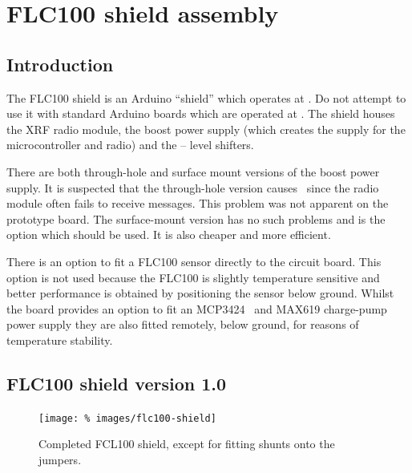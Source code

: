 \chapter{FLC100 shield assembly}

\section{Introduction}
The FLC100 shield is an Arduino ``shield'' which operates at
. Do not attempt to use it with standard Arduino boards
which are operated at . The shield houses the XRF radio
module, the boost power supply (which creates the  supply
for the microcontroller and radio) and the  --  level
shifters.

There are both through-hole and surface mount versions of the boost
power supply. It is suspected that the through-hole version causes
\rfi\ since the radio module often fails to receive messages. This
problem was not apparent on the prototype board. The surface-mount
version has no such problems and is the option which should be
used. It is also cheaper and more efficient.

There is an option to fit a FLC100 sensor directly to the circuit
board. This option is not used because the FLC100 is slightly
temperature sensitive and better performance is obtained by
positioning the sensor below ground. Whilst the board provides an
option to fit an MCP3424 \adc\ and MAX619 charge-pump power supply they
are also fitted remotely, below ground, for reasons of temperature
stability.

\section{FLC100 shield version 1.0}

\begin{figure}
  \centering
  \texttt{[image: \%
    images/flc100-shield]}
  \caption[Completed FLC100 shield]{Completed FCL100 shield, except
    for fitting shunts onto the jumpers. %
    }
  \label{fig:flc100-v1.0}
\end{figure}

